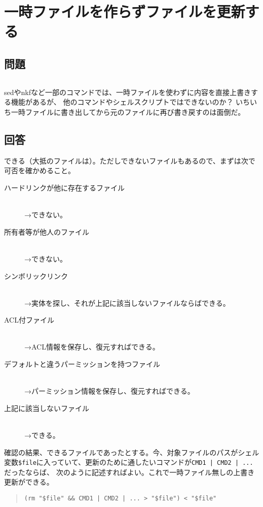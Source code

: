 \section{一時ファイルを作らずファイルを更新する}
\label{recipe:fileoverwriting}

\subsection*{問題}
\noindent
$\!\!\!\!\!$
\begin{grshfboxit}{160.0mm}
	sedやnkfなど一部のコマンドでは、一時ファイルを使わずに内容を直接上書きする機能があるが、
	他のコマンドやシェルスクリプトではできないのか？
	いちいち一時ファイルに書き出してから元のファイルに再び書き戻すのは面倒だ。
\end{grshfboxit}

\subsection*{回答}
できる（大抵のファイルは）。ただしできないファイルもあるので、まずは次で可否を確かめること。
\begin{description}
  \item[ハードリンクが他に存在するファイル] \mbox{}\\→できない。
  \item[所有者等が他人のファイル] \mbox{}\\→できない。
  \item[シンボリックリンク] \mbox{}\\→実体を探し、それが上記に該当しないファイルならばできる。
  \item[ACL付ファイル] \mbox{}\\→ACL情報を保存し、復元すればできる。
  \item[デフォルトと違うパーミッションを持つファイル] \mbox{}\\→パーミッション情報を保存し、復元すればできる。
  \item[上記に該当しないファイル] \mbox{}\\→できる。
\end{description}

確認の結果、できるファイルであったとする。今、対象ファイルのパスがシェル変数\verb|$file|に入っていて、更新のために通したいコマンドが\verb!CMD1 | CMD2 | ...!だったならば、
次のように記述すればよい。これで一時ファイル無しの上書き更新ができる。
\begin{quotation}
	\verb!(rm "$file" && CMD1 | CMD2 | ... > "$file") < "$file"!
\end{quotation}


